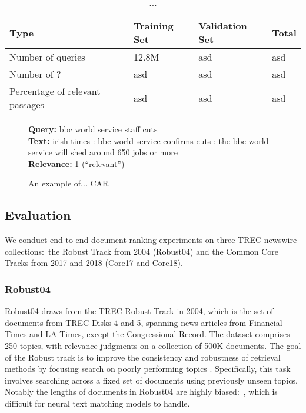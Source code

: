 \begin{table}[b]
\vspace{0.2cm}
\centering
\begin{tabular}{llll}
\toprule
\textbf{Type} \mbox{\hspace{0.5cm}} & \textbf{Training Set} \mbox{\hspace{1.0cm}} & \textbf{Validation Set} \mbox{\hspace{1.0cm}} & \textbf{Total} \mbox{\hspace{1.0cm}} \\
\toprule
Number of queries & 12.8M & asd & asd \\
Number  of ? & asd & asd & asd \\
Percentage of relevant passages  & asd      & asd & asd   \\
\bottomrule
\end{tabular}
\vspace{0.2cm}
\caption{...}%
\label{tab:car-stats}
\vspace{-0.6cm}
\end{table}

\begin{figure}[b!]
	\begin{framed}
		\centering
    		\textbf{Query:} bbc world service staff cuts \\
    		\textbf{Text:} irish times : bbc world service confirms cuts : the bbc world service will shed around 650 jobs or more \\
    		\textbf{Relevance:} 1 (``relevant'')
	\end{framed}
\label{car-example}
 \caption{An example of... CAR}
\end{figure}

\subsection{Evaluation}

We conduct end-to-end document ranking experiments on three TREC newswire collections:\
the Robust Track from 2004 (Robust04) and the Common Core Tracks from 2017 and 2018 (Core17 and Core18).

\subsubsection{Robust04}

Robust04 draws from the TREC Robust Track in 2004, which is the set of documents from TREC Disks 4 and 5, spanning news articles from Financial Times and LA Times, except the Congressional Record.
The dataset comprises 250 topics, with relevance judgments on a collection of 500K documents.
The goal of the Robust track is to improve the consistency and robustness of retrieval methods by focusing search on poorly performing topics .
Specifically, this task involves searching across a fixed set of documents using previously unseen topics.
Notably the lengths of documents in Robust04 are highly biased:\ \myworries{data}, which is difficult for neural text matching models to handle.
\myworries{What does this mean for us?}

